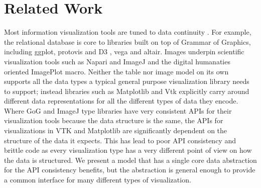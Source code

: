 \documentclass[journal]{vgtc}                %
\begin{document}
\section{Related Work}
Most information visualization tools are tuned to data continuity \cite{HeerSoftware2006,toryRethinkingVisualizationHighlevel2004}. For example, the relational database is core to libraries built on top of Grammar of Graphics\cite{wilkinsonGrammarGraphics2005}, including ggplot\cite{wickhamGgplot2ElegantGraphics2016a}, protovis\cite{bostockProtoviz2009} and D3 \cite{bostockDataDrivenDocuments2011}, vega\cite{satyanarayanDeclarativeInteractionDesign2014} and altair\cite{vanderplasAltairInteractiveStatistical2018}. Images underpin scientific visualization tools such as Napari\cite{nicholas_sofroniew_2021_4533308} and ImageJ\cite{schneiderNIHImageImageJ2012} and  the digital humanaties oriented ImagePlot\cite{studiesCulturevisImageplot2021} macro. Neither the table nor image model on its own supports all the data types a typical general purpose visualization library needs to support; instead libraries such as Matplotlib\cite{hunterMatplotlib2DGraphics2007} and Vtk\cite{hanwellVisualizationToolkitVTK2015, geveci2012vtk} explicitly carry around different data representations for all the different types of data they encode.  Where GoG and ImageJ type libraries have very consistent APIs for their visualization tools because the data structure is the same, the APIs for visualizations in VTK and Matplotlib are significantly dependent on the structure of the data it expects. This has lead to poor API consistency and brittle code as every visualization type has a very different point of view on how the data is structured. We present a model that has a single core data abstraction for the API consistency benefits, but the abstraction is general enough to provide a common interface for many different types of visualization.
\end{document}
